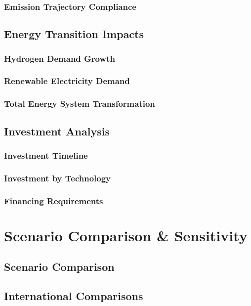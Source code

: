 \documentclass[11pt,a4paper]{report}
\begin{document}
\section{Emission Trajectory Compliance}

\chapter{Energy Transition Impacts}

\section{Hydrogen Demand Growth}
\section{Renewable Electricity Demand}
\section{Total Energy System Transformation}

\chapter{Investment Analysis}

\section{Investment Timeline}
\section{Investment by Technology}
\section{Financing Requirements}

\part{Scenario Comparison \& Sensitivity}
\label{part:scenarios}

\chapter{Scenario Comparison}
\chapter{International Comparisons}
\end{document}
